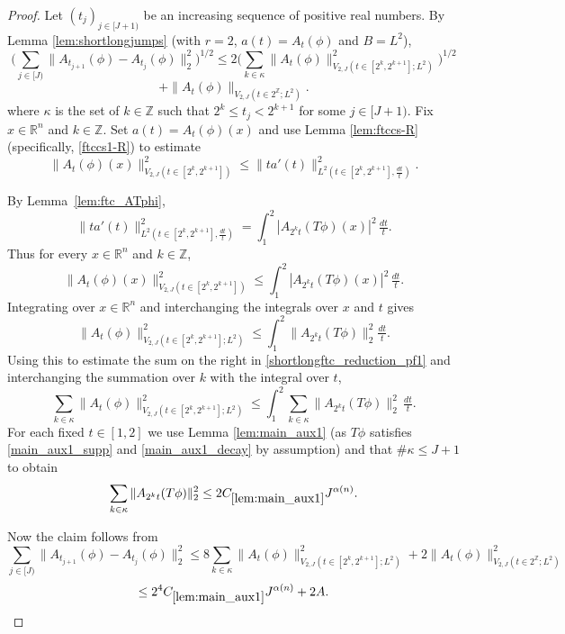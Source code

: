 \documentclass[12pt,reqno]{amsart}
\theoremstyle{plain}
\numberwithin{equation}{section}
\theoremstyle{remark}
\begin{document}
\begin{proof}
Let $(t_j)_{j\in[J+1)}$ be an increasing sequence of positive real numbers.
By Lemma \ref{lem:shortlongjumps} (with $r=2$, $a(t) = A_t(\phi)$ and $B=L^2$),
\begin{equation}\label{shortlongftc_reduction_pf1} \Big(\sum_{j\in [J)} \|A_{t_{j+1}}(\phi)- A_{t_j}(\phi)\|_2^2\Big)^{1/2} \le 2 \Big(\sum_{k\in \kappa} \|A_t(\phi)\|_{V_{2,J}(t\in [2^k, 2^{k+1}]; L^2)}^2\Big)^{1/2}
\end{equation}
\begin{equation}\label{shortlongftc_reduction_pf2}
+\|A_t(\phi)\|_{V_{2,J}(t\in 2^\mathbb{Z}; L^2)}.
\end{equation}
where $\kappa$ is the set of $k\in \mathbb{Z}$ such that $2^{k}\le t_j<2^{k+1}$ for some $j\in [J+1)$.
 Fix $x\in\mathbb{R}^n$ and $k\in\mathbb{Z}$. Set $a(t)=A_t(\phi)(x)$ and use Lemma \ref{lem:ftccs-R} (specifically, \eqref{ftccs1-R}) to estimate
 \[ \|A_t(\phi)(x)\|_{V_{2,J}(t\in [2^k, 2^{k+1}])}^2 \le
 \|ta'(t)\|_{L^2(t\in [2^k, 2^{k+1}],\tfrac{dt}{t})}^2.  \]


By Lemma~\ref{lem:ftc_ATphi},
\[ \|ta'(t)\|_{L^2(t\in [2^k, 2^{k+1}],\tfrac{dt}{t})}^2 = \int_{1}^2 |A_{2^k t}(T\phi)(x)|^2\,\tfrac{dt}{t}. \]
Thus for every $x\in\mathbb{R}^n$ and $k\in\mathbb{Z}$,
\[ \|A_t(\phi)(x)\|_{V_{2,J}(t\in [2^k, 2^{k+1}])}^2 \le\int_{1}^2 |A_{2^k t}(T\phi)(x)|^2\,\tfrac{dt}{t}.  \]
Integrating over $x\in\mathbb{R}^n$ and interchanging the integrals over $x$ and $t$ gives
\[ \|A_t(\phi)\|_{V_{2,J}(t\in [2^k, 2^{k+1}]; L^2)}^2 \le \int_1^2 \|A_{2^k t}(T\phi)\|_2^2 \tfrac{dt}{t}. \]
Using this to estimate the sum on the right in \eqref{shortlongftc_reduction_pf1} and interchanging the summation over $k$ with the integral over $t$,
\[
\sum_{k\in \kappa} \|A_t(\phi)\|_{V_{2,J}(t\in [2^k, 2^{k+1}]; L^2)}^2 \le \int_1^2 \sum_{k\in\kappa} \|A_{2^k t}(T\phi)\|_2^2\,\tfrac{dt}{t}.
\]
For each fixed $t\in [1,2]$ we use Lemma \ref{lem:main_aux1} (as $T\phi$ satisfies \eqref{main_aux1_supp} and \eqref{main_aux1_decay} by assumption) and that $\#\kappa\le J+1$ to obtain
\[ \sum_{k\in\kappa} \|A_{2^k t}(T\phi)\|_2^2 \le 2 C_{\ref{lem:main_aux1}} J^{\alpha(n)}. \]

Now the claim follows from
\[ \sum_{j\in [J)} \|A_{t_{j+1}}(\phi)- A_{t_j}(\phi)\|_2^2 \le 8 \sum_{k\in \kappa} \|A_t(\phi)\|_{V_{2,J}(t\in [2^k, 2^{k+1}]; L^2)}^2 + 2 \|A_t(\phi)\|_{V_{2,J}(t\in 2^\mathbb{Z}; L^2)}^2 \]
\[ \le 2^4 C_{\ref{lem:main_aux1}} J^{\alpha(n)} + 2A.  \]
\end{proof}
\end{document}
